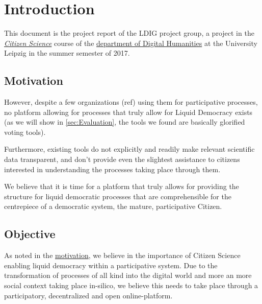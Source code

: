 \chapter{Introduction}
\label{ch:Introduction}


This document is the project report of the LDIG project group, a project in the \href{http://www.dh.uni-leipzig.de/wo/courses/summer-semester-20142015/citizen-science/}{\textit{Citizen Science}} course of the \href{http://www.dh.uni-leipzig.de/wo/}{department of Digital Humanities} at the University Leipzig in the summer semester of 2017.

\section{Motivation}
\label{sec:Motivation}



However, despite a few organizations (ref) using them for participative processes, no platform allowing for processes that truly allow for Liquid Democracy exists (as we will show in \ref{sec:Evaluation}, the tools we found are basically glorified voting tools). 

Furthermore, existing tools do not explicitly and readily make relevant scientific data transparent, and don't provide even the slightest assistance to citizens interested in understanding the processes taking place through them. 

We believe that it is time for a platform that truly allows for providing the structure for liquid democratic processes that are comprehensible for the centrepiece of a democratic system, the mature, participative Citizen.


\section{Objective}
\label{sec:Objective}

As noted in the \href{ssec:Motivation}{motivation}, we believe in the importance of Citizen Science enabling liquid democracy within a participative system. Due to the transformation of processes of all kind into the digital world and more an more social context taking place in-silico, we believe this needs to take place through a participatory, decentralized and open online-platform.

